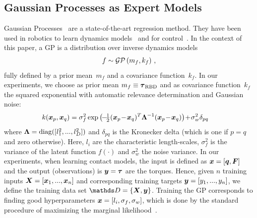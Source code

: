 \subsection{Gaussian Processes as Expert Models}
	Gaussian Processes~\cite{Rasmussen2006} are a state-of-the-art regression method.
	They have been used in robotics to learn dynamics models~\cite{Deisenroth2012} and for control~\cite{Deisenroth2014}.
    In the context of this paper, a GP is a distribution over inverse dynamics models 
	\begin{align}
		f \sim \mathcal{GP} \left( m_f,k_f \right) \,,
	\end{align}
	fully defined by a prior mean~$m_f$ and a covariance function~$k_f$.
	In our experiments, we choose as prior mean $m_f \equiv \boldsymbol{\tau}_\text{RBD}$ and as covariance function~$k_f$ the squared exponential with automatic relevance determination and Gaussian noise:
	\begin{align}
		{k(\vec x_p,\vec x_q)} &= \sigma_f^2\exp\left(\!-\!\tfrac{1}{2}(\vec x_p\! -\!\vec x_q)^T {\mat \Lambda\inv} (\vec x_p \!-\! \vec x_q)\right) \!+\! \sigma_w^2\delta_{pq}
		\label{sec:GP:cov:SE}
	\end{align}
	where ${\boldsymbol \Lambda}=\operatorname{\mathrm{diag}}([l^2_1,...,l^2_D])$ and $\delta_{pq}$ is the Kronecker delta (which is one if $p=q$ and zero otherwise). Here, $l_i$ are the characteristic length-scales, $\sigma^2_f$ is the variance of the latent function $f(\cdot)$ and $\sigma^2_w$ the noise variance. 
    In our experiments, when learning contact models, the input is defined as $\boldsymbol{x} = [\boldsymbol q,\boldsymbol{F}]$ and the output (observations) is $\boldsymbol{y} = \boldsymbol{\tau}$ are the torques.
    Hence, given $n$ training inputs $\boldsymbol X=[\boldsymbol{x}_1,...,\boldsymbol{x}_n]$ and corresponding training targets $\boldsymbol y=[ y_1,..., y_n]$, we define the training data set $\dataset = \{\mat X,\mat y\}$. 
Training the GP corresponds to finding good hyperparameters $\boldsymbol{x} = [l_i, \sigma_f, \sigma_w]$, which is done by the standard procedure of maximizing the marginal likelihood~\cite{Rasmussen2006}.   
    
